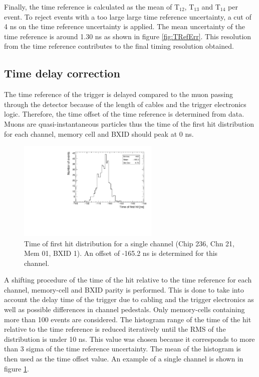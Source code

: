 \documentclass{JINST}
\begin{document}
Finally, the time reference is calculated as the mean of T$_{12}$, T$_{13}$ and T$_{14}$ per event. To reject events with a too large large time reference uncertainty, a cut of 4 ns on the time reference uncertainty is applied. The mean uncertainty of the time reference is around 1.30 ns as shown in figure \ref{fig:TRefErr}. This resolution from the time reference contributes to the final timing resolution obtained.

\subsection{Time delay correction}

The time reference of the trigger is delayed compared to the muon passing through the detector because of the length of cables and the trigger electronics logic. Therefore, the time offset of the time reference is determined from data. Muons are quasi-instantaneous particles thus the time of the first hit distribution for each channel, memory cell and BXID should peak at 0 ns.

\begin{figure}[htbp!]
	\centering
	\includegraphics[width=0.6\textwidth]{fig/Timing_Chip236_Chn21_Mem01_BXID1_withOffset.pdf}
	\caption{Time of first hit distribution for a single channel (Chip 236, Chn 21, Mem 01, BXID 1). An offset of -165.2 ns is determined for this channel.}\label{fig:TimeChnwithOffset}
\end{figure}

A shifting procedure of the time of the hit relative to the time reference for each channel, memory-cell and BXID parity is performed. This is done to take into account the delay time of the trigger due to cabling and the trigger electronics as well as possible differences in channel pedestals. Only memory-cells containing more than 100 events are considered. The histogram range of the time of the hit relative to the time reference is reduced iteratively until the RMS of the distribution is under 10 ns. This value was chosen because it corresponds to more than 3 sigma of the time reference uncertainty. The mean of the histogram is then used as the time offset value. An example of a single channel is shown in figure \ref{fig:TimeChnwithOffset}.
\end{document}
